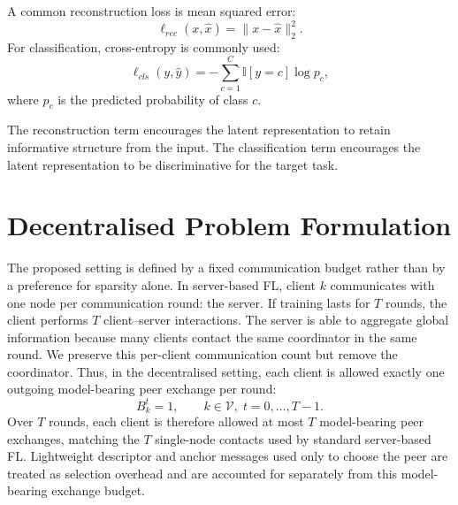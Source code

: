 \documentclass[conference]{IEEEtran}
\newcommand{\rev}[1]{{\color{red}#1}}
\begin{document}
A common reconstruction loss is mean squared error:
\begin{equation}
    \ell_{rec}(x,\hat{x}) = \|x-\hat{x}\|_2^2.
    \label{eq:auto-011}
\end{equation}
For classification, cross-entropy is commonly used:
\begin{equation}
    \ell_{cls}(y,\hat{y}) = -\sum_{c=1}^{C} \mathbb{I}[y=c]\log p_c,
    \label{eq:auto-012}
\end{equation}
where \(p_c\) is the predicted probability of class \(c\).

The reconstruction term encourages the latent representation to retain informative structure from the input. The classification term encourages the latent representation to be discriminative for the target task.

\section{Decentralised Problem Formulation}
\label{sec:decentralised-problem-formulation}

The proposed setting is defined by a fixed communication budget rather than by a preference for sparsity alone. In server-based FL, client $k$ communicates with one node per communication round: the server. If training lasts for $T$ rounds, the client performs $T$ client--server interactions. The server is able to aggregate global information because many clients contact the same coordinator in the same round. We preserve this per-client communication count but remove the coordinator. Thus, in the decentralised setting, each client is allowed exactly one outgoing \rev{model-bearing} peer \rev{exchange} per round:
\begin{equation}
    B_k^t = 1,
    \qquad k\in\mathcal{V},\; t=0,\dots,T-1.
    \label{eq:one_peer_budget}
\end{equation}
Over $T$ rounds, each client is therefore allowed at most $T$ \rev{model-bearing} peer exchanges, matching the $T$ single-node contacts used by standard server-based FL. \rev{Lightweight descriptor and anchor messages used only to choose the peer are treated as selection overhead and are accounted for separately from this model-bearing exchange budget.}
\end{document}
